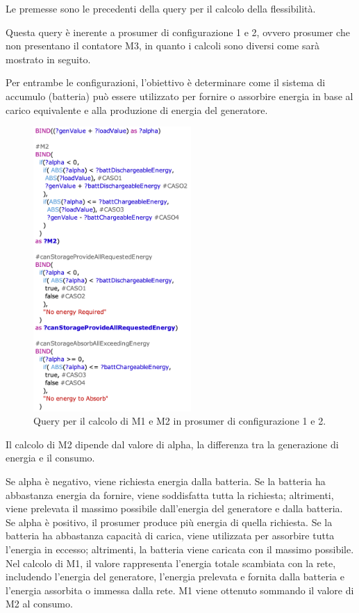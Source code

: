 Le premesse sono le precedenti della query per il calcolo della flessibilità.

Questa query è inerente a prosumer di configurazione 1 e 2, ovvero prosumer che non presentano il contatore M3, in quanto i calcoli sono diversi come sarà mostrato in seguito.

Per entrambe le configurazioni, l'obiettivo è determinare come il sistema di accumulo (batteria) può essere utilizzato per fornire o assorbire energia
in base al carico equivalente e alla produzione di energia del generatore.

\begin{figure}[H]
    \centering
    \includegraphics[width=6cm]{images/query_m1m2_config0102.png}
    \caption{Query per il calcolo di M1 e M2 in prosumer di configurazione 1 e 2.}
    \label{fig:query_m1_m2}
\end{figure}

Il calcolo di M2 dipende dal valore di alpha, la differenza tra la generazione di energia e il consumo.

Se alpha è negativo, viene richiesta energia dalla batteria. Se la batteria ha abbastanza energia da fornire, viene soddisfatta tutta la richiesta; altrimenti, viene prelevata il massimo possibile dall'energia del generatore e dalla batteria.
Se alpha è positivo, il prosumer produce più energia di quella richiesta. Se la batteria ha abbastanza capacità di carica, viene utilizzata per assorbire tutta l'energia in eccesso; altrimenti, la batteria viene caricata con il massimo possibile.
Nel calcolo di M1, il valore rappresenta l'energia totale scambiata con la rete, includendo l'energia del generatore, l'energia prelevata e fornita dalla batteria e l'energia assorbita o immessa dalla rete.
M1 viene ottenuto sommando il valore di M2 al consumo.


